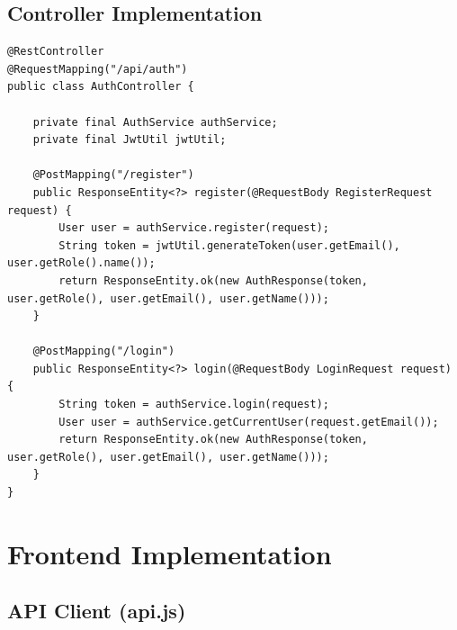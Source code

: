 \documentclass[12pt,a4paper,twoside]{book}
\begin{document}
\subsection{Controller Implementation}

\begin{lstlisting}[style=java]
@RestController
@RequestMapping("/api/auth")
public class AuthController {
    
    private final AuthService authService;
    private final JwtUtil jwtUtil;
    
    @PostMapping("/register")
    public ResponseEntity<?> register(@RequestBody RegisterRequest request) {
        User user = authService.register(request);
        String token = jwtUtil.generateToken(user.getEmail(), user.getRole().name());
        return ResponseEntity.ok(new AuthResponse(token, user.getRole(), user.getEmail(), user.getName()));
    }
    
    @PostMapping("/login")
    public ResponseEntity<?> login(@RequestBody LoginRequest request) {
        String token = authService.login(request);
        User user = authService.getCurrentUser(request.getEmail());
        return ResponseEntity.ok(new AuthResponse(token, user.getRole(), user.getEmail(), user.getName()));
    }
}
\end{lstlisting}

\section{Frontend Implementation}

\subsection{API Client (api.js)}
\end{document}
